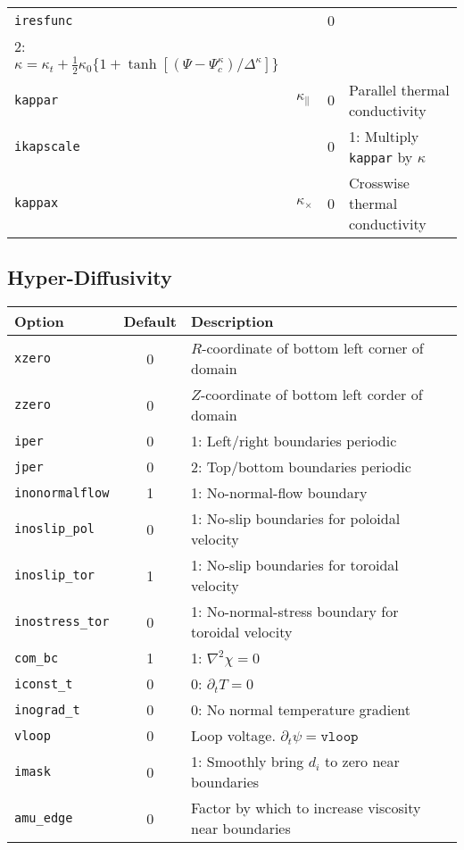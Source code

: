 \begin{tabular}{llcp{2.25in}}
  \texttt{iresfunc} & & 0 &
  \begin{minipage}[t]{2.2in}
    0: $\kappa = \kappa_t + \kappa_0*p/T^{3/2}$\\
    2: $\kappa = \kappa_t + \frac{1}{2}\kappa_0 \{1 + \tanh[(\Psi - \Psi_c^{\kappa})/\Delta^{\kappa}]\}$
  \end{minipage}\\
  \texttt{kappar} & $\kappa_\parallel$ & 0 
                  & Parallel thermal conductivity\\
  \texttt{ikapscale}& & 0 & 1: Multiply \texttt{kappar} by $\kappa$\\
  \texttt{kappax} & $\kappa_\times$ & 0 
                  & Crosswise thermal conductivity\\ 
\end{tabular}

\subsection{Hyper-Diffusivity}

\begin{tabular}{lcp{2.2in}}
  \textbf{Option} & \textbf{Default} & \textbf{Description}\\
  \hline
  \texttt{xzero}  & 0 & $R$-coordinate of bottom left corner of domain\\
  \texttt{zzero}  & 0 & $Z$-coordinate of bottom left corder of domain\\
  \texttt{iper}   & 0 & 1: Left/right boundaries periodic\\
  \texttt{jper}   & 0 & 2: Top/bottom boundaries periodic\\
  \texttt{inonormalflow}& 1 & 1: No-normal-flow boundary\\
  \texttt{inoslip\_pol} & 0 & 1: No-slip boundaries for poloidal velocity\\
  \texttt{inoslip\_tor} & 1 & 1: No-slip boundaries for toroidal velocity\\
  \texttt{inostress\_tor}&0 & 1: No-normal-stress boundary for toroidal 
                                 velocity\\
  \texttt{com\_bc}& 1 & 1: $\nabla^2 \chi = 0$\\
  \texttt{iconst\_t}  & 0 & 0: $\partial_t T = 0$\\
  \texttt{inograd\_t} & 0 & 0: No normal temperature gradient\\
  \texttt{vloop}  & 0 & Loop voltage.  $\partial_t \psi = \mathtt{vloop}$\\
  \texttt{imask}  & 0 & 1: Smoothly bring $d_i$ to zero near
    boundaries\\
  \texttt{amu\_edge} & 0 &    Factor by which to increase viscosity near 
                              boundaries
\end{tabular}


